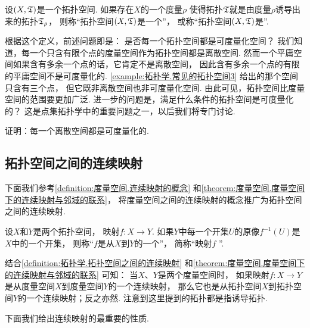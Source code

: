 \begin{definition}
设\((X,{\mathfrak T})\)是一个拓扑空间.
如果存在\(X\)的一个度量\(\rho\)
使得拓扑\({\mathfrak T}\)就是由度量\(\rho\)诱导出来的拓扑\({\mathfrak T}_\rho\)，
则称“拓扑空间\((X,{\mathfrak T})\)是一个”，
或称“拓扑空间\((X,{\mathfrak T})\)是”.
\end{definition}

根据这个定义，前述问题即是：
是否每一个拓扑空间都是可度量化空间？
我们知道，每一个只含有限个点的度量空间作为拓扑空间都是离散空间.
然而一个平庸空间如果含有多余一个点的话，它肯定不是离散空间，
因此含有多余一个点的有限的平庸空间不是可度量化的.
\cref{example:拓扑学.常见的拓扑空间3} 给出的那个空间只含有三个点，
但它既非离散空间也非可度量化空间.
由此可见，拓扑空间比度量空间的范围要更加广泛.
进一步的问题是，满足什么条件的拓扑空间是可度量化的？
这是点集拓扑学中的重要问题之一，以后我们将专门讨论.

\begin{example}
证明：每一个离散空间都是可度量化的.
\end{example}

\subsection{拓扑空间之间的连续映射}
下面我们参考\cref{definition:度量空间.连续映射的概念}
和\cref{theorem:度量空间.度量空间下的连续映射与邻域的联系}，
将度量空间之间的连续映射的概念推广为拓扑空间之间的连续映射.

\begin{definition}\label{definition:拓扑学.拓扑空间之间的连续映射}
设\(X\)和\(Y\)是两个拓扑空间，
映射\(f\colon X \to Y\).
如果\(Y\)中每一个开集\(U\)的原像\(f^{-1}(U)\)是\(X\)中的一个开集，
则称“\(f\)是从\(X\)到\(Y\)的一个”，
简称“映射\(f\) ”.
\end{definition}
结合\cref{definition:拓扑学.拓扑空间之间的连续映射}
和\cref{theorem:度量空间.度量空间下的连续映射与邻域的联系} 可知：
当\(X\)、\(Y\)是两个度量空间时，
如果映射\(f\colon X \to Y\)是从度量空间\(X\)到度量空间\(Y\)的一个连续映射，
那么它也是从拓扑空间\(X\)到拓扑空间\(Y\)的一个连续映射；反之亦然.
注意到这里提到的拓扑都是指诱导拓扑.

下面我们给出连续映射的最重要的性质.

